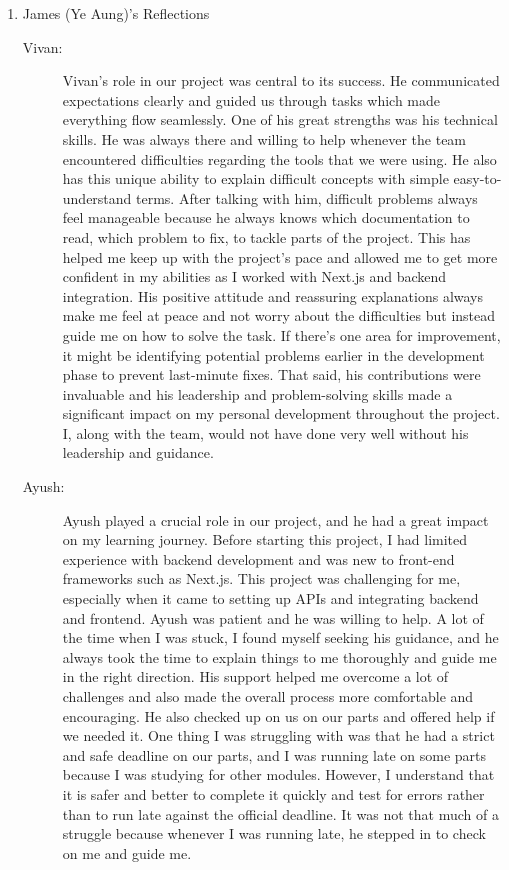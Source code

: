 \documentclass[a4paper, 12pt]{article}
\begin{document}
\begin{enumerate}
\begin{description}
        \end{description}
    \item James (Ye Aung)'s Reflections
        \begin{description}
            \item[Vivan: ] Vivan’s role in our project was central to its success. He communicated expectations clearly and guided us through tasks which made everything flow seamlessly. One of his great strengths was his technical skills. He was always there and willing to help whenever the team encountered difficulties regarding the tools that we were using. He also has this unique ability to explain difficult concepts with simple easy-to-understand terms. After talking with him, difficult problems always feel manageable because he always knows which documentation to read, which problem to fix, to tackle parts of the project. This has helped me keep up with the project’s pace and allowed me to get more confident in my abilities as I worked with Next.js and backend integration. His positive attitude and reassuring explanations always make me feel at peace and not worry about the difficulties but instead guide me on how to solve the task. If there’s one area for improvement, it might be identifying potential problems earlier in the development phase to prevent last-minute fixes. That said, his contributions were invaluable and his leadership and problem-solving skills made a significant impact on my personal development throughout the project. I, along with the team, would not have done very well without his leadership and guidance.
            \item[Ayush: ] Ayush played a crucial role in our project, and he had a great impact on my learning journey. Before starting this project, I had limited experience with backend development and was new to front-end frameworks such as Next.js. This project was challenging for me, especially when it came to setting up APIs and integrating backend and frontend. Ayush was patient and he was willing to help. A lot of the time when I was stuck, I found myself seeking his guidance, and he always took the time to explain things to me thoroughly and guide me in the right direction. His support helped me overcome a lot of challenges and also made the overall process more comfortable and encouraging. He also checked up on us on our parts and offered help if we needed it. One thing I was struggling with was that he had a strict and safe deadline on our parts, and I was running late on some parts because I was studying for other modules. However, I understand that it is safer and better to complete it quickly and test for errors rather than to run late against the official deadline. It was not that much of a struggle because whenever I was running late, he stepped in to check on me and guide me.

\end{description}
\end{enumerate}
\end{document}
